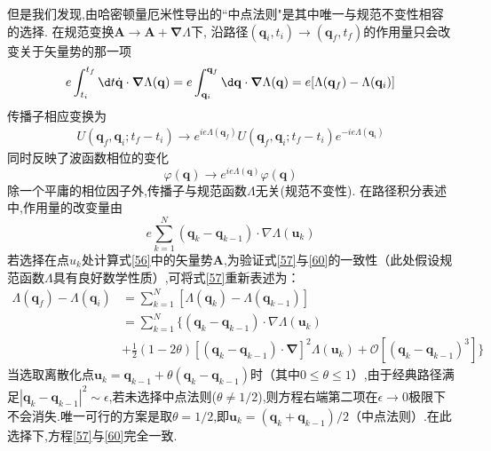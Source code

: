 但是我们发现,由哈密顿量厄米性导出的``中点法则"是其中唯一与规范不变性相容的选择. 在规范变换$\mathbf{A} \to \mathbf{A} + \boldsymbol{\nabla}\Lambda$下, 沿路径$(\mathbf{q}_i, t_i) \to (\mathbf{q}_f, t_f)$的作用量只会改变关于矢量势的那一项
\begin{equation}\label{57}
    e\int_{t_i}^{t_f}\d t\dot{\mathbf{q}}\cdot\boldsymbol{\nabla}\Lambda(\mathbf{q})=e\int_{\mathbf{q}_i}^{\mathbf{q}_f}\d\mathbf{q}\cdot\boldsymbol{\nabla}\Lambda(\mathbf{q})=e[\Lambda(\mathbf{q}_f)-\Lambda(\mathbf{q}_i)]
\end{equation}
传播子相应变换为
\begin{equation}
    \begin{aligned}U(\mathbf{q}_f,\mathbf{q}_i;t_f-t_i)\to e^{ie\Lambda(\mathbf{q}_f)}U(\mathbf{q}_f,\mathbf{q}_i;t_f-t_i)e^{-ie\Lambda(\mathbf{q}_i)}\end{aligned}
\end{equation}
同时反映了波函数相位的变化
\begin{equation}
    \varphi(\mathbf{q})\to e^{ie\Lambda(\mathbf{q})}\varphi(\mathbf{q})
\end{equation}
除一个平庸的相位因子外,传播子与规范函数$\Lambda$无关(规范不变性). 在路径积分表述中,作用量的改变量由
\begin{equation}\label{60}
    e\sum_{k=1}^N(\mathbf{q}_k-\mathbf{q}_{k-1})\cdot\nabla\Lambda(\mathbf{u}_k)
\end{equation}
若选择在点$u_k$处计算式\ref{56}中的矢量势$\mathbf{A}$,为验证式\ref{57}与\ref{60}的一致性（此处假设规范函数$\Lambda$具有良好数学性质）,可将式\ref{57}重新表述为：
\begin{equation}
    \begin{aligned}\Lambda(\mathbf{q}_f)-\Lambda(\mathbf{q}_i)&=\sum_{k=1}^N[\Lambda(\mathbf{q}_k)-\Lambda(\mathbf{q}_{k-1})]\\&=\sum_{k=1}^N\Big\{(\mathbf{q}_k-\mathbf{q}_{k-1})\cdot\nabla\Lambda(\mathbf{u}_k)\\&+\frac{1}{2}(1-2\theta)[(\mathbf{q}_k-\mathbf{q}_{k-1})\cdot\boldsymbol{\nabla}]^2\Lambda(\mathbf{u}_k)+\mathcal{O}[(\mathbf{q}_k-\mathbf{q}_{k-1})^3]\bigg\}\end{aligned}
\end{equation}
当选取离散化点$\mathbf{u}_k = \mathbf{q}_{k-1} + \theta(\mathbf{q}_k - \mathbf{q}_{k-1})$时（其中$0 \leq \theta \leq 1$）,由于经典路径满足$|\mathbf{q}_k - \mathbf{q}_{k-1}|^2 \sim \epsilon$,若未选择中点法则($\theta \neq 1/2$),则方程右端第二项在$\epsilon \to 0$极限下不会消失.唯一可行的方案是取$\theta = 1/2$,即$\mathbf{u}_k = (\mathbf{q}_k + \mathbf{q}_{k-1})/2$（中点法则）.在此选择下,方程\ref{57}与\ref{60}完全一致.

